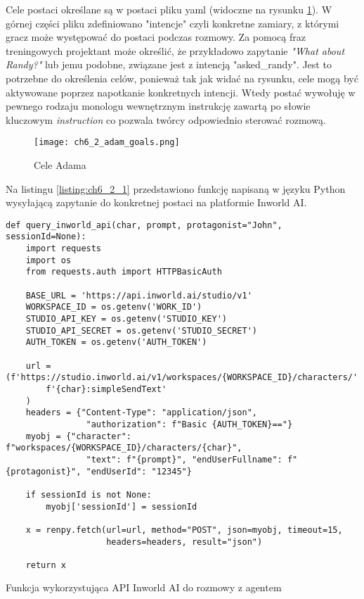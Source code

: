 \newpage

Cele postaci określane są w postaci pliku \gls{yaml} (widoczne na rysunku \ref{fig:ch6_2_adam_goals}). W górnej
części pliku zdefiniowano "intencje" czyli konkretne zamiary, z którymi gracz może występować do postaci
podczas rozmowy. Za pomocą fraz treningowych projektant może określić, że przykładowo zapytanie
\textit{"What about Randy?"} lub jemu podobne, związane jest z intencją "asked\_randy". Jest to potrzebne
do określenia celów, ponieważ tak jak widać na rysunku, cele mogą być aktywowane poprzez napotkanie
konkretnych intencji. Wtedy postać wywołuję w pewnego rodzaju monologu wewnętrznym instrukcję zawartą
po słowie kluczowym \textit{instruction} co pozwala twórcy odpowiednio sterować rozmową.

\begin{figure}[h!]
    \centering
    \texttt{[image: ch6\_2\_adam\_goals.png]}
    \caption{Cele Adama}
    \label{fig:ch6_2_adam_goals}
\end{figure}

\newpage

Na listingu \ref{listing:ch6_2_1} przedstawiono funkcję napisaną w języku Python wysyłającą zapytanie
do konkretnej postaci na platformie Inworld AI.

\begin{listing}
    \begin{verbatim}  
def query_inworld_api(char, prompt, protagonist="John", sessionId=None):
    import requests
    import os
    from requests.auth import HTTPBasicAuth

    BASE_URL = 'https://api.inworld.ai/studio/v1'
    WORKSPACE_ID = os.getenv('WORK_ID')
    STUDIO_API_KEY = os.getenv('STUDIO_KEY')
    STUDIO_API_SECRET = os.getenv('STUDIO_SECRET')
    AUTH_TOKEN = os.getenv('AUTH_TOKEN')

    url = (f'https://studio.inworld.ai/v1/workspaces/{WORKSPACE_ID}/characters/'
        f'{char}:simpleSendText'
    )
    headers = {"Content-Type": "application/json",
                "authorization": f"Basic {AUTH_TOKEN}=="}
    myobj = {"character": f"workspaces/{WORKSPACE_ID}/characters/{char}",
                "text": f"{prompt}", "endUserFullname": f"{protagonist}", "endUserId": "12345"}

    if sessionId is not None:
        myobj['sessionId'] = sessionId

    x = renpy.fetch(url=url, method="POST", json=myobj, timeout=15,
                    headers=headers, result="json")

    return x
\end{verbatim}
    \caption{Funkcja wykorzystująca API Inworld AI do rozmowy z agentem} \label{listing:ch6_2_1}
\end{listing}

